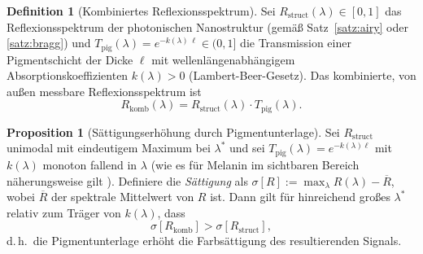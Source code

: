 ﻿\documentclass[a4paper,12pt]{article}
\theoremstyle{definition}
\newtheorem{definition}{Definition}
\newtheorem{proposition}{Proposition}
\begin{document}
\begin{definition}[Kombiniertes Reflexionsspektrum]
	\label{def:kombiniert}
	Sei $R_{\mathrm{struct}}(\lambda)\in[0,1]$ das Reflexionsspektrum der
	photonischen Nanostruktur (gemäß Satz~\ref{satz:airy} oder
	\ref{satz:bragg}) und $T_{\mathrm{pig}}(\lambda) =
	e^{-k(\lambda)\,\ell}\in(0,1]$ die Transmission einer
	Pigmentschicht der Dicke $\ell$ mit wellenlängenabhängigem
	Absorptionskoeffizienten $k(\lambda)>0$ (Lambert-Beer-Gesetz).
	Das kombinierte, von außen messbare Reflexionsspektrum ist
	\[
	R_{\mathrm{komb}}(\lambda) = R_{\mathrm{struct}}(\lambda)\cdot
	T_{\mathrm{pig}}(\lambda).
	\]
\end{definition}

\begin{proposition}[Sättigungserhöhung durch Pigmentunterlage]
	\label{prop:saettigung}
	Sei $R_{\mathrm{struct}}$ unimodal mit eindeutigem Maximum bei
	$\lambda^*$ und sei $T_{\mathrm{pig}}(\lambda) = e^{-k(\lambda)\ell}$
	mit $k(\lambda)$ monoton fallend in $\lambda$ (wie es für Melanin im
	sichtbaren Bereich näherungsweise gilt \cite{vukusic2003photonic}).
	Definiere die \emph{Sättigung} als
	$\sigma[R] := \max_\lambda R(\lambda) - \overline{R}$, wobei
	$\overline{R}$ der spektrale Mittelwert von $R$ ist.
	Dann gilt für hinreichend großes $\lambda^*$ relativ zum Träger von
	$k(\lambda)$, dass
	\[
	\sigma[R_{\mathrm{komb}}] > \sigma[R_{\mathrm{struct}}],
	\]
	d.\,h.\ die Pigmentunterlage erhöht die Farbsättigung des
	resultierenden Signals.
\end{proposition}
\end{document}

